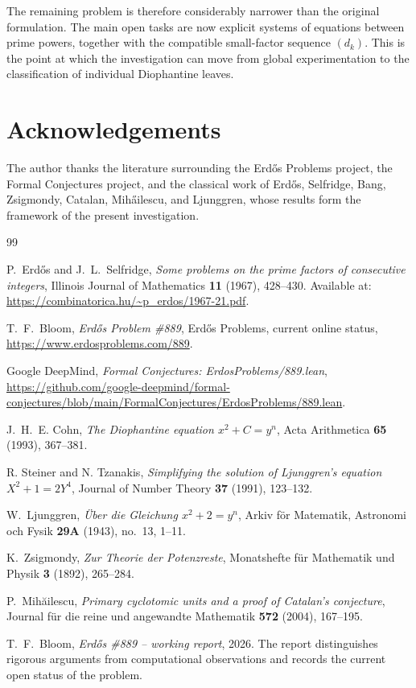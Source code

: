 \documentclass[11pt]{article}
\begin{document}
The remaining problem is therefore considerably narrower than the original
formulation.  The main open tasks are now explicit systems of equations
between prime powers, together with the compatible small-factor sequence
\((d_k)\).  This is the point at which the investigation can move from
global experimentation to the classification of individual Diophantine
leaves.

\section*{Acknowledgements}

The author thanks the literature surrounding the Erd\H{o}s Problems project,
the Formal Conjectures project, and the classical work of Erd\H{o}s,
Selfridge, Bang, Zsigmondy, Catalan, Mih\H ailescu, and Ljunggren, whose
results form the framework of the present investigation.

\begin{thebibliography}{99}

P.~Erd\H{o}s and J.~L.~Selfridge,
\emph{Some problems on the prime factors of consecutive integers},
Illinois Journal of Mathematics \textbf{11} (1967), 428--430.
Available at:
\url{https://combinatorica.hu/~p_erdos/1967-21.pdf}.

T.~F.~Bloom,
\emph{Erd\H{o}s Problem \#889},
Erd\H{o}s Problems, current online status,
\url{https://www.erdosproblems.com/889}.

Google DeepMind,
\emph{Formal Conjectures: ErdosProblems/889.lean},
\url{https://github.com/google-deepmind/formal-conjectures/blob/main/FormalConjectures/ErdosProblems/889.lean}.

J.~H.~E. Cohn,
\emph{The Diophantine equation $x^2+C=y^n$},
Acta Arithmetica \textbf{65} (1993), 367--381.

R. Steiner and N. Tzanakis,
\emph{Simplifying the solution of Ljunggren's equation $X^2+1=2Y^4$},
Journal of Number Theory \textbf{37} (1991), 123--132.

W.~Ljunggren,
\emph{\"Uber die Gleichung \(x^2+2=y^n\)},
Arkiv f\"or Matematik, Astronomi och Fysik \textbf{29A} (1943), no.~13,
1--11.

K.~Zsigmondy,
\emph{Zur Theorie der Potenzreste},
Monatshefte f\"ur Mathematik und Physik \textbf{3} (1892), 265--284.

P.~Mih\u{a}ilescu,
\emph{Primary cyclotomic units and a proof of Catalan's conjecture},
Journal f\"ur die reine und angewandte Mathematik \textbf{572} (2004),
167--195.

T.~F.~Bloom,
\emph{Erd\H{o}s \#889 -- working report},
2026.
The report distinguishes rigorous arguments from computational observations
and records the current open status of the problem.

\end{thebibliography}
\end{document}
